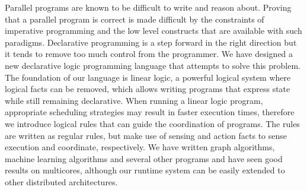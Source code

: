 Parallel programs are known to be difficult to write and reason about. Proving that a parallel
program is correct is made difficult by the constraints of imperative programming and the low
level constructs that are available with such paradigms. Declarative
programming is a step forward in the right direction but it tends to remove
too much control from the programmer.
We have designed a new declarative logic programming language that attempts to solve
this problem. The foundation of our language is linear logic, a powerful logical system where logical
facts can be removed, which allows writing programs that express state
while still remaining declarative. When running a linear logic program, appropriate
scheduling strategies may result in faster execution times, therefore we introduce
logical rules that can guide the coordination of programs. The rules are written as regular rules,
but make use of sensing and action facts to sense execution and coordinate, respectively.
We have written graph algorithms, machine learning algorithms and several other programs and have
seen good results on multicores, although our runtime system can be easily
extended to other distributed architectures.